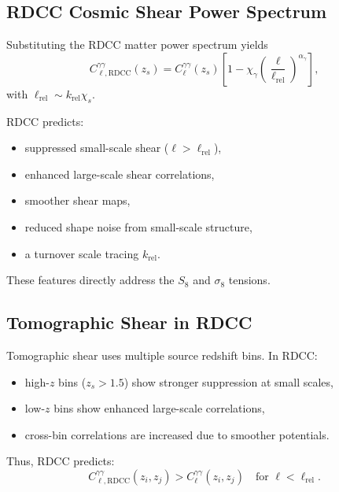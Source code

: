 \documentclass[11pt,a4paper]{article}
\begin{document}
\subsection{RDCC Cosmic Shear Power Spectrum}

Substituting the RDCC matter power spectrum yields
\begin{equation}
C_{\ell,\mathrm{RDCC}}^{\gamma\gamma}(z_{s})
=
C_{\ell}^{\gamma\gamma}(z_{s})
\left[
1
-
\chi_{\gamma}
\left(
\frac{\ell}{\ell_{\mathrm{rel}}}
\right)^{\alpha_{\gamma}}
\right],
\end{equation}
with $\ell_{\mathrm{rel}} \sim k_{\mathrm{rel}}\chi_{s}$.

RDCC predicts:
\begin{itemize}
\item suppressed small-scale shear ($\ell > \ell_{\mathrm{rel}}$),
\item enhanced large-scale shear correlations,
\item smoother shear maps,
\item reduced shape noise from small-scale structure,
\item a turnover scale tracing $k_{\mathrm{rel}}$.
\end{itemize}

These features directly address the $S_{8}$ and $\sigma_{8}$ tensions.

\subsection{Tomographic Shear in RDCC}

Tomographic shear uses multiple source redshift bins.  
In RDCC:
\begin{itemize}
\item high-$z$ bins ($z_{s} > 1.5$) show stronger suppression at small scales,
\item low-$z$ bins show enhanced large-scale correlations,
\item cross-bin correlations are increased due to smoother potentials.
\end{itemize}

Thus, RDCC predicts:
\begin{equation}
C_{\ell,\mathrm{RDCC}}^{\gamma\gamma}(z_{i},z_{j})
>
C_{\ell}^{\gamma\gamma}(z_{i},z_{j})
\quad \text{for } \ell < \ell_{\mathrm{rel}}.
\end{equation}
\end{document}
